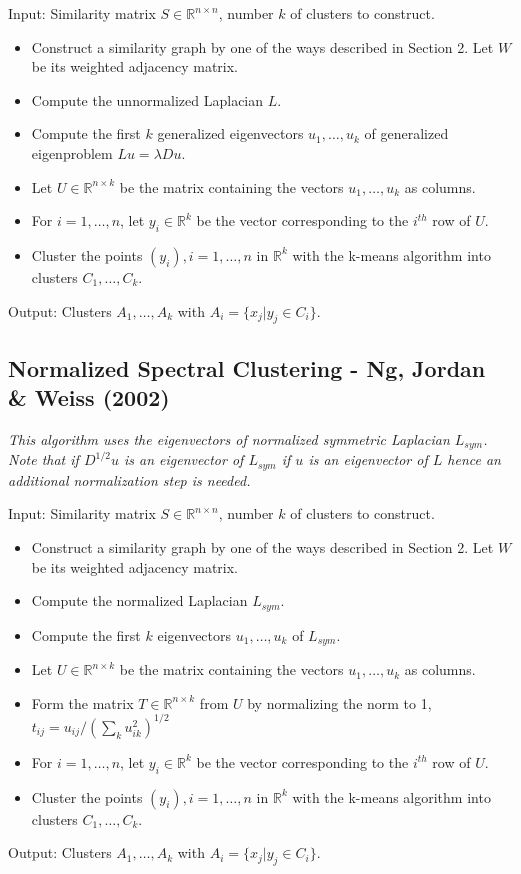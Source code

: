\documentclass[10pt,a4paper, nocenter]{report}
\begin{document}
	Input: Similarity matrix $S \in \mathbb{R}^{n\times n}$, number $k$ of clusters to construct.
	\begin{itemize}
		\item Construct a similarity graph by one of the ways described in Section 2. Let $W$ be its weighted adjacency matrix.
		\item Compute the unnormalized Laplacian $L$.
		\item Compute the first $k$ generalized eigenvectors $u_{1},\dots, u_{k} $ of generalized eigenproblem $Lu = \lambda Du$.
		\item Let $U \in \mathbb{R}^{n\times k}$ be the matrix containing the vectors $u_{1},\dots, u_{k}$ as columns.
		\item For $i = 1,\dots, n$, let $y_{i} \in \mathbb{R}^k$ be the vector corresponding to the $i^{th}$ row of $U$.
		\item Cluster the points $(y_{i}), i=1,\dots,n$ in $\mathbb{R}^k$ with the k-means algorithm into clusters $C_{1},\dots, C_{k}$.
	\end{itemize}
	Output: Clusters $A_{1},\dots, A_{k}$ with $A_{i} = \{x_{j}| y_{j} \in C_{i}\}$.

	\subsection{Normalized Spectral Clustering - Ng, Jordan \& Weiss (2002)\cite{ng-jordan-01}}
	\textit{This algorithm uses the eigenvectors of normalized symmetric Laplacian $L_{sym}$. Note that if $D^{1/2}u$ is an eigenvector of $L_{sym}$ if $u$ is an eigenvector of $L$ hence an additional normalization step is needed.}

	Input: Similarity matrix $S \in \mathbb{R}^{n\times n}$, number $k$ of clusters to construct.
	\begin{itemize}
		\item Construct a similarity graph by one of the ways described in Section 2. Let $W$ be its weighted adjacency matrix.
		\item Compute the normalized Laplacian $L_{sym}$.
		\item Compute the first $k$ eigenvectors $u_{1},\dots, u_{k} $ of $L_{sym}$.
		\item Let $U \in \mathbb{R}^{n\times k}$ be the matrix containing the vectors $u_{1},\dots, u_{k}$ as columns.
		\item Form the matrix $T \in \mathbb{R}^{n\times k}$ from $U$ by normalizing the norm to 1, $t_{ij} = u_{ij}/(\sum_{k}u_{ik}^2)^{1/2}$
		\item For $i = 1,\dots, n$, let $y_{i} \in \mathbb{R}^k$ be the vector corresponding to the $i^{th}$ row of $U$.
		\item Cluster the points $(y_{i}), i=1,\dots,n$ in $\mathbb{R}^k$ with the k-means algorithm into clusters $C_{1},\dots, C_{k}$.
	\end{itemize} Output: Clusters $A_{1},\dots, A_{k}$ with $A_{i} = \{x_{j}| y_{j} \in C_{i}\}$.
\end{document}
